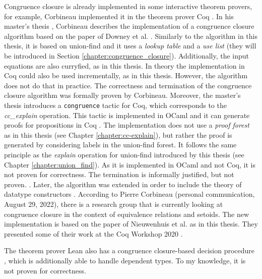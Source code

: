 Congruence closure is already implemented in some interactive theorem provers, for example,  Corbineau implemented it in the theorem prover Coq \cite{congruence-coq}.
In his master's thesis \cite{congruenceclosure-coq}, Corbineau describes the implementation of a congruence closure algorithm based on the paper of Downey et al. \cite{congruenceclosure-og3}.
Similarly to the algorithm in this thesis, it is based on union-find and it uses a \emph{lookup table} and a \emph{use list} (they will be introduced in Section \ref{chapter:congruence_closure}).
Additionally, the input equations are also curryfied, as in this thesis.
In theory the implementation in Coq could also be used incrementally, as in this thesis. However, the algorithm does not do that in practice.
The correctness and termination of the congruence closure algorithm was formally proven by Corbineau.
Moreover, the master's thesis introduces a \lstinline|congruence| tactic for Coq, which corresponds to the \emph{cc\_explain} operation.
This tactic is implemented in OCaml and it can generate proofs for propositions in Coq \cite{congruence-coq}.
The implementation does not use a \emph{proof forest} as in this thesis (see Chapter \ref{chapter:cc-explain}), but rather the proof is generated by considering labels in the union-find forest.
It follows the same principle as the \emph{explain} operation for union-find introduced by this thesis (see Chapter \ref{chapter:union_find}).
As it is implemented in OCaml and not Coq, it is not proven for correctness. The termination is informally justified, but not proven. \cite{congruenceclosure-coq}.
Later, the algorithm was extended in order to include the theory of datatype constructors \cite{Corbineau}.
According to Pierre Corbineau (personal communication, August 29, 2022), there is a research group that is currently looking at congruence closure  in the context of equivalence relations and setoids. The new implementation is based on the paper of Nieuwenhuis et al. \cite{Nieuwenhuis} as in this thesis. They presented some of their work at the Coq Workshop 2020 \cite{coq-workshop}.

The theorem prover Lean also has a congruence closure-based decision procedure \cite{congruenceclosure-lean}, which is additionally able to handle dependent types. To my knowledge, it is not proven for correctness.

